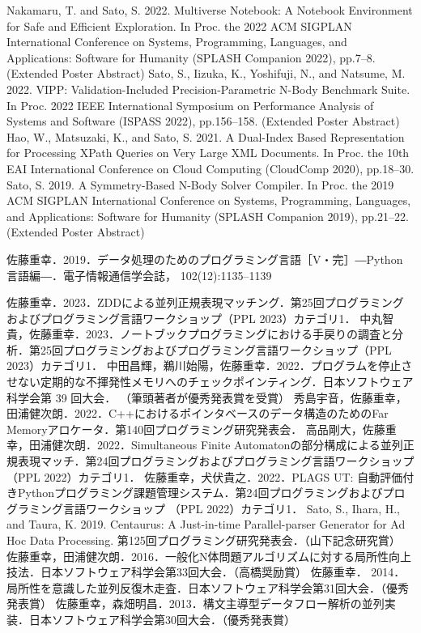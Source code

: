 \documentclass[dvipdfmx]{jsarticle}
\begin{document}
\begin{thebibliography}{100}
  Nakamaru, T. and Sato, S. 2022. Multiverse Notebook: A Notebook Environment for Safe and Efficient Exploration. In Proc. the 2022 ACM SIGPLAN International Conference on Systems, Programming, Languages, and Applications: Software for Humanity (SPLASH Companion 2022), pp.7–8. (Extended Poster Abstract)
  Sato, S., Iizuka, K., Yoshifuji, N., and Natsume, M. 2022. VIPP: Validation-Included Precision-Parametric N-Body Benchmark Suite. In Proc. 2022 IEEE International Symposium on Performance Analysis of Systems and Software (ISPASS 2022), pp.156–158. (Extended Poster Abstract)
  Hao, W., Matsuzaki, K., and Sato, S. 2021. A Dual-Index Based Representation for Processing XPath Queries on Very Large XML Documents. In Proc. the 10th EAI International Conference on Cloud Computing (CloudComp 2020), pp.18–30.
  Sato, S. 2019. A Symmetry-Based N-Body Solver Compiler. In Proc. the 2019 ACM SIGPLAN International Conference on Systems, Programming, Languages, and Applications: Software for Humanity (SPLASH Companion 2019), pp.21–22. (Extended Poster Abstract)

  佐藤重幸．2019．データ処理のためのプログラミング言語［V・完］―Python 言語編―．電子情報通信学会誌， 102(12):1135–1139

  佐藤重幸．2023．ZDDによる並列正規表現マッチング．第25回プログラミングおよびプログラミング言語ワークショップ（PPL 2023）カテゴリ1．
  中丸智貴，佐藤重幸．2023．ノートブックプログラミングにおける手戻りの調査と分析．第25回プログラミングおよびプログラミング言語ワークショップ（PPL 2023）カテゴリ1．
  中田昌輝，鵜川始陽，佐藤重幸．2022．プログラムを停止させない定期的な不揮発性メモリへのチェックポインティング．日本ソフトウェア科学会第 39 回大会． （筆頭著者が優秀発表賞を受賞）
  秀島宇音，佐藤重幸，田浦健次朗．2022．C++におけるポインタベースのデータ構造のためのFar Memoryアロケータ．第140回プログラミング研究発表会．
  高品剛大，佐藤重幸，田浦健次朗．2022．Simultaneous Finite Automatonの部分構成による並列正規表現マッチ．第24回プログラミングおよびプログラミング言語ワークショップ（PPL 2022）カテゴリ1．
  佐藤重幸，犬伏貴之．2022．PLAGS UT: 自動評価付きPythonプログラミング課題管理システム．第24回プログラミングおよびプログラミング言語ワークショップ （PPL 2022）カテゴリ1．
  Sato, S., Ihara, H., and Taura, K. 2019. Centaurus: A Just-in-time Parallel-parser Generator for Ad Hoc Data Processing. 第125回プログラミング研究発表会．（山下記念研究賞）
  佐藤重幸，田浦健次朗．2016．一般化N体問題アルゴリズムに対する局所性向上技法．日本ソフトウェア科学会第33回大会．（高橋奨励賞）
  佐藤重幸． 2014．局所性を意識した並列反復木走査．日本ソフトウェア科学会第31回大会．（優秀発表賞）
  佐藤重幸，森畑明昌．2013．構文主導型データフロー解析の並列実装．日本ソフトウェア科学会第30回大会．（優秀発表賞）


\end{thebibliography}
\end{document}
